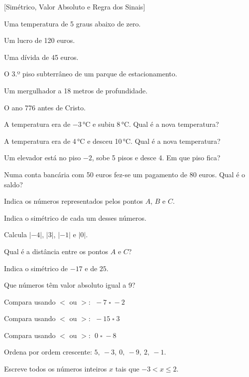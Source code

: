 \documentclass[12pt]{article}
\begin{document}
[Simétrico, Valor Absoluto e Regra dos Sinais]


\begin{exercicios}
  \item Uma temperatura de 5 graus abaixo de zero.
  \item Um lucro de 120 euros.
  \item Uma dívida de 45 euros.
  \item O 3.º piso subterrâneo de um parque de estacionamento.
  \item Um mergulhador a 18 metros de profundidade.
  \item O ano 776 antes de Cristo.
  \item A temperatura era de $-3$\,°C e subiu 8\,°C. Qual é a nova temperatura?
  \item A temperatura era de 4\,°C e desceu 10\,°C. Qual é a nova temperatura?
  \item Um elevador está no piso $-2$, sobe 5 pisos e desce 4. Em que piso fica?
  \item Numa conta bancária com 50 euros fez-se um pagamento de 80 euros. Qual é o saldo?
\end{exercicios}


\begin{center}
\end{center}

\begin{exercicios}
  \item Indica os números representados pelos pontos $A$, $B$ e $C$.
  \item Indica o simétrico de cada um desses números.
  \item Calcula $|-4|$, $|3|$, $|-1|$ e $|0|$.
  \item Qual é a distância entre os pontos $A$ e $C$?
  \item Indica o simétrico de $-17$ e de $25$.
  \item Que números têm valor absoluto igual a 9?
  \item Compara usando $<$ ou $>$: $\;-7 \;\square\; -2$
  \item Compara usando $<$ ou $>$: $\;-15 \;\square\; 3$
  \item Compara usando $<$ ou $>$: $\;0 \;\square\; -8$
  \item Ordena por ordem crescente: $5,\ -3,\ 0,\ -9,\ 2,\ -1$.
  \item Escreve todos os números inteiros $x$ tais que $-3 < x \le 2$.
\end{exercicios}
\end{document}
